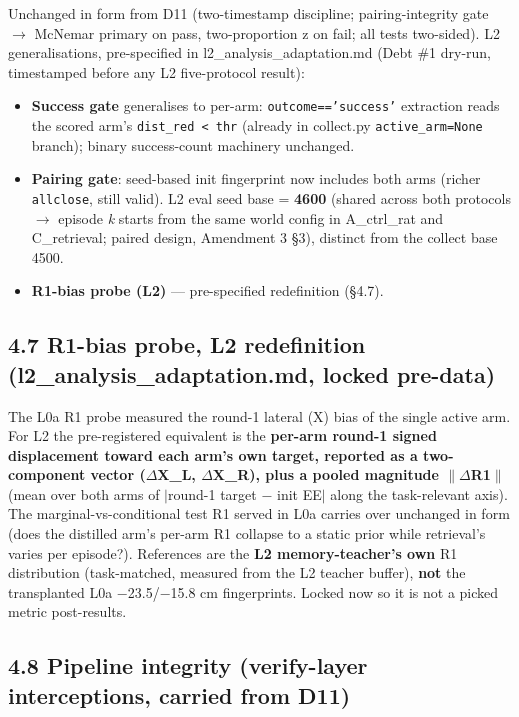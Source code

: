 Unchanged in form from D11 (two-timestamp discipline; pairing-integrity
gate $\rightarrow$ McNemar primary on pass, two-proportion z on fail; all tests
two-sided). L2 generalisations, pre-specified in l2\_analysis\_adaptation.md
(Debt \#1 dry-run, timestamped before any L2 five-protocol result):

\begin{itemize}
\item \textbf{Success gate} generalises to per-arm: \texttt{outcome=='success'} extraction
  reads the scored arm's \texttt{dist\_red < thr} (already in collect.py
  \texttt{active\_arm=None} branch); binary success-count machinery unchanged.
\item \textbf{Pairing gate}: seed-based init fingerprint now includes both arms
  (richer \texttt{allclose}, still valid). L2 eval seed base = \textbf{4600} (shared
  across both protocols $\rightarrow$ episode \emph{k} starts from the same world config
  in A\_ctrl\_rat and C\_retrieval; paired design, Amendment 3 \S3), distinct
  from the collect base 4500.
\item \textbf{R1-bias probe (L2)} --- pre-specified redefinition (\S4.7).
\end{itemize}

\subsection*{4.7 R1-bias probe, L2 redefinition (l2\_analysis\_adaptation.md, locked pre-data)}

The L0a R1 probe measured the round-1 lateral (X) bias of the single
active arm. For L2 the pre-registered equivalent is the \textbf{per-arm round-1
signed displacement toward each arm's own target, reported as a
two-component vector ($\Delta$X\_L, $\Delta$X\_R), plus a pooled magnitude $\|\Delta$R1$\|$} (mean
over both arms of $|$round-1 target $-$ init EE$|$ along the task-relevant
axis). The marginal-vs-conditional test R1 served in L0a carries over
unchanged in form (does the distilled arm's per-arm R1 collapse to a
static prior while retrieval's varies per episode?). References are the
\textbf{L2 memory-teacher's own} R1 distribution (task-matched, measured from
the L2 teacher buffer), \textbf{not} the transplanted L0a $-$23.5/$-$15.8 cm
fingerprints. Locked now so it is not a picked metric post-results.

\subsection*{4.8 Pipeline integrity (verify-layer interceptions, carried from D11)}

